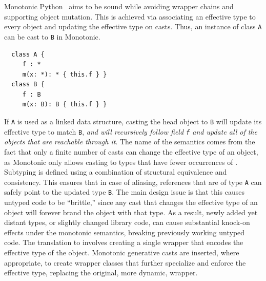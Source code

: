 \documentclass[a4paper,USenglish]{tex/lipics-v2016}
\newcommand{\code}[1]{{\tt #1}\xspace}
\begin{document}
Monotonic Python~\cite{Siek2015} aims to be sound while avoiding wrapper
chains and supporting object mutation. This is achieved via associating an
effective type to every object and updating the effective type on casts.
Thus, an instance of class \code A can be cast to \code B in Monotonic.

\begin{lstlisting}
  class A {
     f : *
     m(x: *): * { this.f } }
  class B {
     f : B
     m(x: B): B { this.f } }
\end{lstlisting}

\noindent If \code A is used as a linked data structure, casting the head object
to \code B will update its effective type to match \code B, \emph{and will
recursively follow field \code f and update all of the objects that are
reachable through it}. The name of the semantics comes from the fact that only a
finite number of casts can change the effective type of an object, as Monotonic
only allows casting to types that have fewer occurrences of \any. Subtyping is
defined using a combination of structural equivalence and consistency. This
ensures that in case of aliasing, references that are of type \code A can safely
point to the updated type \code B.  The main design issue is that this causes
untyped code to be ``brittle,'' since any cast that changes the effective type
of an object will forever brand the object with that type. As a result, newly
added yet distant types, or slightly changed library code, can cause substantial
knock-on effects under the monotonic semantics, breaking previously working
untyped code.  The translation to \kafka involves creating a single wrapper that
encodes the effective type of the object. Monotonic generative casts are
inserted, where appropriate, to create wrapper classes that further specialize
and enforce the effective type, replacing the original, more dynamic, wrapper.
\end{document}
